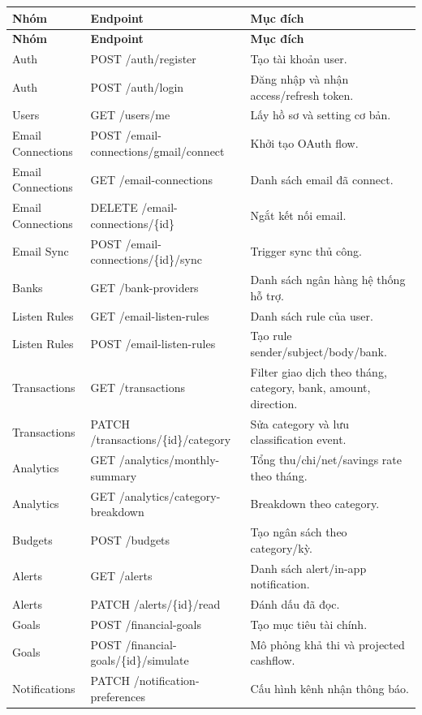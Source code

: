 \documentclass[11pt,a4paper]{article}
\renewcommand{\thead}[1]{\textbf{\color{PrimaryDark}#1}}
\newenvironment{tableblock}{\Needspace{8\baselineskip}\vspace{0.25em}}{\vspace{0.75em}}
\begin{document}
\begin{tableblock}
\scriptsize
\begin{longtable}{L{3.3cm}L{5.6cm}L{6.5cm}}
\thead{Nhóm} & \thead{Endpoint} & \thead{Mục đích} \\
\endfirsthead
{}\thead{Nhóm} & \thead{Endpoint} & \thead{Mục đích} \\
\endhead
Auth & POST /auth/register & Tạo tài khoản user. \\
Auth & POST /auth/login & Đăng nhập và nhận access/refresh token. \\
Users & GET /users/me & Lấy hồ sơ và setting cơ bản. \\
Email Connections & POST /email-connections/gmail/connect & Khởi tạo OAuth flow. \\
Email Connections & GET /email-connections & Danh sách email đã connect. \\
Email Connections & DELETE /email-connections/\{id\} & Ngắt kết nối email. \\
Email Sync & POST /email-connections/\{id\}/sync & Trigger sync thủ công. \\
Banks & GET /bank-providers & Danh sách ngân hàng hệ thống hỗ trợ. \\
Listen Rules & GET /email-listen-rules & Danh sách rule của user. \\
Listen Rules & POST /email-listen-rules & Tạo rule sender/subject/body/bank. \\
Transactions & GET /transactions & Filter giao dịch theo tháng, category, bank, amount, direction. \\
Transactions & PATCH /transactions/\{id\}/category & Sửa category và lưu classification event. \\
Analytics & GET /analytics/monthly-summary & Tổng thu/chi/net/savings rate theo tháng. \\
Analytics & GET /analytics/category-breakdown & Breakdown theo category. \\
Budgets & POST /budgets & Tạo ngân sách theo category/kỳ. \\
Alerts & GET /alerts & Danh sách alert/in-app notification. \\
Alerts & PATCH /alerts/\{id\}/read & Đánh dấu đã đọc. \\
Goals & POST /financial-goals & Tạo mục tiêu tài chính. \\
Goals & POST /financial-goals/\{id\}/simulate & Mô phỏng khả thi và projected cashflow. \\
Notifications & PATCH /notification-preferences & Cấu hình kênh nhận thông báo. \\
\end{longtable}
\end{tableblock}
\end{document}
